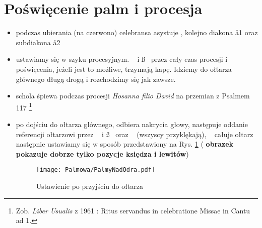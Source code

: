 \section{Poświęcenie palm i procesja}

\begin{itemize}
	\item podczas ubierania (na {\color{red} czerwono}) celebransa asystuje ,
	      kolejno diakona \aa1 oraz subdiakona \aa2
	\item ustawiamy się w szyku procesyjnym. \dd~ i \ss~ przez cały czas
	      procesji i poświęcenia, jeżeli jest to możliwe, trzymają kapę. Idziemy
				do ołtarza głównego długą drogą  i rozchodzimy się jak zawsze. 
	\item schola śpiewa podczas procesji \textit{Hosanna filio David} na
	      przemian z Psalmem 117 \footnote{Zob. \textit{Liber Usualis} z 1961 :
		      Ritus servandus in celebratione Missae in Cantu ad 1.}
	\item po dojściu do ołtarza głównego,  odbiera nakrycia głowy,
				następuje  oddanie referencji ołtarzowi przez \dd~ i \ss~ oraz \ii~
				(wszyscy przyklękają), \ii~ całuje ołtarz następnie ustawiamy się w
				sposób przedstawiony na Rys.  \ref{fig:przyjscie} ( \textbf{obrazek
				pokazuje dobrze tylko pozycje księdza i lewitów})

	      \begin{figure}[h]
		      \centering
		      \texttt{[image: Palmowa/PalmyNadOdra.pdf]}
		      \caption{Ustawienie po przyjściu do ołtarza}
		      \label{fig:przyjscie}
	      \end{figure}


\end{itemize}
